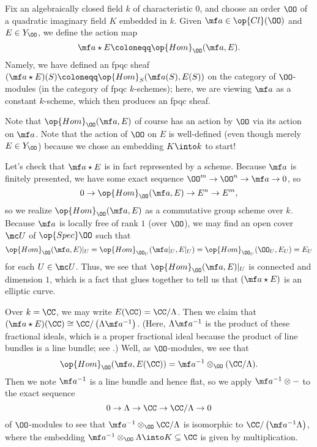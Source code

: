 \documentclass[../notes.tex]{subfiles}
\begin{document}
\begin{definition}
	Fix an algebraically closed field $k$ of characteristic $0$, and choose an order $\OO$ of a quad\-ratic imaginary field $K$ embedded in $k$. Given $\mf a\in\op{Cl}(\OO)$ and $E\in Y_\OO$, we define the action map
	\[\mf a\star E\coloneqq\op{Hom}_\OO(\mf a,E).\]
	Namely, we have defined an fpqc sheaf $(\mf a\star E)(S)\coloneqq\op{Hom}_S(\mf a(S),E(S))$ on the category of $\OO$-modules (in the category of fpqc $k$-schemes); here, we are viewing $\mf a$ as a constant $k$-scheme, which then produces an fpqc sheaf.
\end{definition}
\begin{remark}
	Note that $\op{Hom}_\OO(\mf a,E)$ of course has an action by $\OO$ via its action on $\mf a$. Note that the action of $\OO$ on $E$ is well-defined (even though merely $E\in Y_\OO$) because we chose an embedding $K\into k$ to start!
\end{remark}
\begin{remark}
	Let's check that $\mf a\star E$ is in fact represented by a scheme. Because $\mf a$ is finitely presented, we have some exact sequence $\OO^m\to\OO^n\to\mf a\to0$, so
	\[0\to\op{Hom}_\OO(\mf a,E)\to E^n\to E^m,\]
	so we realize $\op{Hom}_\OO(\mf a,E)$ as a commutative group scheme over $k$. Because $\mf a$ is locally free of rank $1$ (over $\OO$), we may find an open cover $\mc U$ of $\op{Spec}\OO$ such that
	\[\op{Hom}_\OO(\mf a,E)|_U=\op{Hom}_{\OO_U}(\mf a|_U,E|_U)=\op{Hom}_{\OO_U}(\OO_U,E_U)=E_U\]
	for each $U\in\mc U$. Thus, we see that $\op{Hom}_\OO(\mf a,E)|_U$ is connected and dimension $1$, which is a fact that glues together to tell us that $(\mf a\star E)$ is an elliptic curve.
\end{remark}
\begin{example} \label{ex:cl-action-on-cm-over-c}
	Over $k=\CC$, we may write $E(\CC)=\CC/\Lambda$. Then we claim that $(\mf a\star E)(\CC)\cong \CC/\left(\Lambda\mf a^{-1}\right)$. (Here, $\Lambda\mf a^{-1}$ is the product of these fractional ideals, which is a proper fractional ideal because the product of line bundles is a line bundle; see .) Well, as $\OO$-modules, we see that
	\[\op{Hom}_\OO(\mf a,E(\CC))=\mf a^{-1}\otimes_\OO(\CC/\Lambda).\]
	Then we note $\mf a^{-1}$ is a line bundle and hence flat, so we apply $\mf a^{-1}\otimes-$ to the exact sequence
	\[0\to\Lambda\to\CC\to\CC/\Lambda\to0\]
	of $\OO$-modules to see that $\mf a^{-1}\otimes_\OO\CC/\Lambda$ is isomorphic to $\CC/\left(\mf a^{-1}\Lambda\right)$, where the embedding $\mf a^{-1}\otimes_\OO\Lambda\into K\subseteq\CC$ is given by multiplication.
\end{example}
\end{document}

